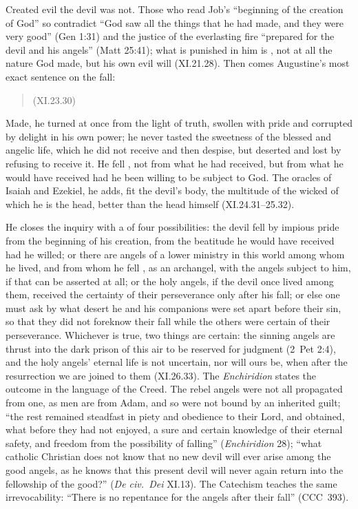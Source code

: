 Created evil the devil was not. Those who read Job's ``beginning of the
creation of God'' so contradict ``God saw all the things that he had
made, and they were very good'' (Gen 1:31) and the justice of the
everlasting fire ``prepared for the devil and his angels'' (Matt 25:41);
what is punished in him is , not at all the nature God made,
but his own evil will (XI.21.28). Then comes Augustine's most exact
sentence on the fall:
\begin{quote}
 (XI.23.30)
\end{quote}
Made, he turned at once from the light of truth, swollen with pride and
corrupted by delight in his own power; he never tasted the sweetness of
the blessed and angelic life, which he did not receive and then despise,
but deserted and lost by refusing to receive it. He fell ,
not from what he had received, but from what he would have received had he
been willing to be subject to God. The oracles of Isaiah and Ezekiel, he
adds, fit the devil's body, the multitude of the wicked of which he is the
head, better than the head himself (XI.24.31--25.32).

He closes the inquiry with a  of four possibilities:
the devil fell by impious pride from the beginning of his creation, from
the beatitude he would have received had he willed; or there are angels
of a lower ministry in this world among whom he lived, and from whom he
fell , as an archangel, with the angels subject
to him, if that can be asserted at all; or the holy angels, if the devil
once lived among them, received the certainty of their perseverance only
after his fall; or else one must ask by what desert he and his companions
were set apart before their sin, so that they did not foreknow their fall
while the others were certain of their perseverance. Whichever is true, two
things are certain: the sinning angels are thrust into the dark prison of
this air to be reserved for judgment (2~Pet 2:4), and the holy angels'
eternal life is not uncertain, nor will ours be, when after the
resurrection we are joined to them (XI.26.33). The \emph{Enchiridion}
states the outcome in the language of the Creed. The rebel angels were
not all propagated from one, as men are from Adam, and so were not bound
by an inherited guilt; ``the rest remained steadfast in piety and
obedience to their Lord, and obtained, what before they had not enjoyed, a
sure and certain knowledge of their eternal safety, and freedom from the
possibility of falling'' (\emph{Enchiridion} 28); ``what catholic
Christian does not know that no new devil will ever arise among the good
angels, as he knows that this present devil will never again return into
the fellowship of the good?'' (\emph{De civ.\ Dei} XI.13). The Catechism teaches the same irrevocability:
``There is no repentance for the angels after their fall'' (CCC~393).

